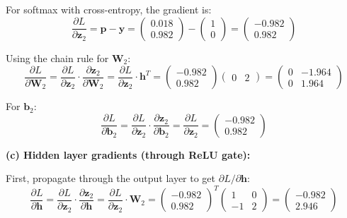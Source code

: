 \documentclass[11pt,a4paper]{article}
\begin{document}
For softmax with cross-entropy, the gradient is:
\[
\frac{\partial L}{\partial \mathbf{z}_2} = \mathbf{p} - \mathbf{y}
= \begin{pmatrix}0.018\\[2pt] 0.982\end{pmatrix} - \begin{pmatrix}1\\[2pt] 0\end{pmatrix}
= \begin{pmatrix}-0.982\\[2pt] 0.982\end{pmatrix}
\]

Using the chain rule for $\mathbf{W}_2$:
\[
\frac{\partial L}{\partial \mathbf{W}_2} = \frac{\partial L}{\partial \mathbf{z}_2} \cdot \frac{\partial \mathbf{z}_2}{\partial \mathbf{W}_2}
= \frac{\partial L}{\partial \mathbf{z}_2} \cdot \mathbf{h}^T
= \begin{pmatrix}-0.982\\[2pt] 0.982\end{pmatrix}\begin{pmatrix}0 & 2\end{pmatrix}
= \begin{pmatrix}0 & -1.964\\[2pt] 0 & 1.964\end{pmatrix}
\]

For $\mathbf{b}_2$:
\[
\frac{\partial L}{\partial \mathbf{b}_2} = \frac{\partial L}{\partial \mathbf{z}_2} \cdot \frac{\partial \mathbf{z}_2}{\partial \mathbf{b}_2}
= \frac{\partial L}{\partial \mathbf{z}_2}
= \begin{pmatrix}-0.982\\[2pt] 0.982\end{pmatrix}
\]

\textbf{(c) Hidden layer gradients (through ReLU gate):}

First, propagate through the output layer to get $\partial L / \partial \mathbf{h}$:
\[
\frac{\partial L}{\partial \mathbf{h}} = \frac{\partial L}{\partial \mathbf{z}_2} \cdot \frac{\partial \mathbf{z}_2}{\partial \mathbf{h}}
= \frac{\partial L}{\partial \mathbf{z}_2} \cdot \mathbf{W}_2
= \begin{pmatrix}-0.982\\[2pt] 0.982\end{pmatrix}^T \begin{pmatrix}1 & 0\\[2pt] -1 & 2\end{pmatrix}
= \begin{pmatrix}-0.982\\[2pt] 2.946\end{pmatrix}
\]
\end{document}
